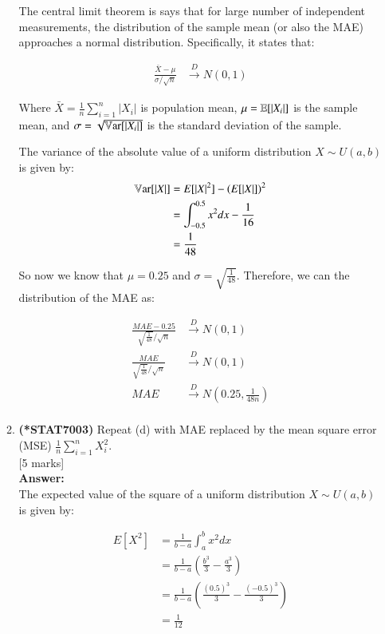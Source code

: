 \documentclass[12pt]{article}
\begin{document}
\begin{enumerate}
\begin{enumerate}
The central limit theorem is says that for large number of independent measurements, the distribution of the sample mean (or also the MAE) approaches a normal distribution. Specifically, it states that:

\begin{align*}
\frac{\bar{X} - \mu}{\sigma/\sqrt{n}} &\xrightarrow{D} N(0, 1)
\end{align*}

Where $\bar{X} = \frac{1}{n} \sum_{i=1}^n |X_i|$ is population mean, $\mu = {\mathbb E}[|X_i|]$ is the sample mean, and $\sigma = \sqrt{\mathbb{V}\mathrm{ar}[|X_i|]}$ is the standard deviation of the sample.

The variance of the absolute value of a uniform distribution $X \sim U(a, b)$ is given by:
\begin{align*}
\mathbb{V}\mathrm{ar}[|X|] &= E[|X|^2] - (E[|X|])^2 \\
&= \int_{-0.5}^{0.5} x^2 dx - \frac{1}{16} \\
&= \frac{1}{48} \\
\end{align*}

So now we know that $\mu = 0.25$ and $\sigma = \sqrt{\frac{1}{48}}$. Therefore, we can the distribution of the MAE as:

\begin{align*}
\frac{MAE - 0.25}{\sqrt{\frac{1}{48}}/\sqrt{n}} &\xrightarrow{D} N(0, 1) \\
\frac{MAE}{\sqrt{\frac{1}{48}}/\sqrt{n}} &\xrightarrow{D} N(0, 1) \\
MAE &\xrightarrow{D} N\left(0.25, \frac{1}{48n}\right) \\
\end{align*}
%

\item 
{\bf (*STAT7003)} Repeat (d) with MAE replaced by the mean square error (MSE) $\frac{1}{n} \sum_{i=1}^n X_i^2$. 
			\\\phantom{1}\hfill [5 marks]
%
\\
\textbf{Answer:}
\\
The expected value of the square of a uniform distribution $X \sim U(a, b)$ is given by:

\begin{align*}
E[X^2] &= \frac{1}{b-a} \int_a^b x^2 dx \\
&= \frac{1}{b-a} \left(\frac{b^3}{3} - \frac{a^3}{3}\right) \\
&= \frac{1}{b-a} \left(\frac{(0.5)^3}{3} - \frac{(-0.5)^3}{3}\right) \\
&= \frac{1}{12} \\
\end{align*}


\end{enumerate}
\end{enumerate}
\end{document}
